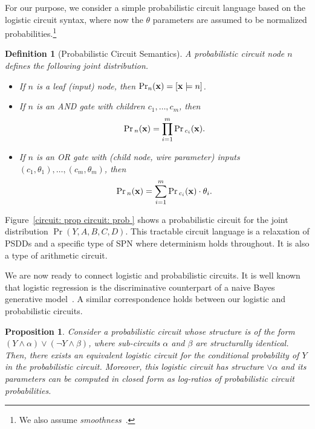 \documentclass[letterpaper]{article} %
\newtheorem{proposition}[corollary]{Proposition}
\newtheorem{definition}{Definition}
\newcommand{\node}{n}
\newcommand{\sample}{{\bf x}}
\begin{document}
For our purpose, we consider a simple probabilistic circuit language based on the logistic circuit syntax, where now the $\theta$ parameters are assumed to be  normalized probabilities.\footnote{We also assume \emph{smoothness}~\cite{darwicheJAIR02}.}
\begin{definition}[Probabilistic Circuit Semantics]
\label{de: probabilistic circuit semantics}
A probabilistic circuit node $n$ defines the following joint distribution.
\begin{itemize}
\item[--] If $\node$ is a leaf (input) node, then $\Pr_n(\sample) =[\sample \models n]$.

\item[--] If $\node$ is an AND gate with children $c_1,\dots,c_m$, then
\begin{align*}
\Pr{_n}(\sample) =  \prod_{i=1}^m \Pr{_{c_i}}(\sample).
\end{align*}

\item[--] If $\node$ is an OR gate with (child node, wire parameter) inputs $(c_1,\theta_1),\dots, (c_m, \theta_m)$, then
\begin{align*}
\Pr{_n}({\bf x}) =    \sum_{i=1}^m  \Pr{_{c_i}}(\sample)\cdot \theta_i.
\end{align*}
\end{itemize}
\end{definition}

Figure~\ref{circuit: prop circuit: prob } shows a probabilistic circuit for the joint distribution $\Pr(Y,A,B,C,D)$. This tractable circuit language is a relaxation of PSDDs \cite{KisaVCD14} and a specific type of SPN \cite{poon2011sum} where determinism holds throughout. It is also a type of arithmetic circuit.

We are now ready to connect logistic and probabilistic circuits. It is well known that logistic regression is the discriminative counterpart of a naive Bayes generative model~\cite{ng2002discriminative}. A similar correspondence holds between our logistic and probabilistic circuits.
\begin{proposition}
\label{prop: correspondence}
Consider a probabilistic circuit whose structure is of the form $(Y \land \alpha) \lor (\neg Y \land \beta)$, where sub-circuits $\alpha$ and $\beta$ are structurally identical.
Then, there exists an equivalent logistic circuit for the conditional probability of $Y$ in the probabilistic circuit. Moreover, this logistic circuit has structure $\lor \alpha$ and its parameters can be computed in closed form as log-ratios of probabilistic circuit probabilities.
\end{proposition}
\end{document}
